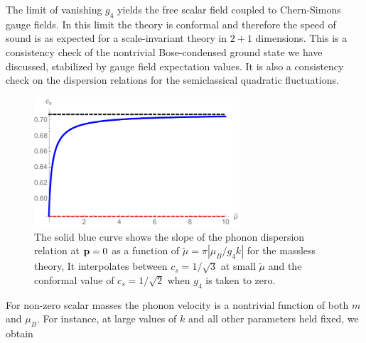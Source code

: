 \eea
The limit of vanishing $g_4$ yields the free scalar field coupled to Chern-Simons gauge fields. In this limit the theory is conformal and therefore the speed of sound is as expected for a scale-invariant theory in $2+1$ dimensions. This is a consistency check of  the nontrivial Bose-condensed ground state we have discussed, stabilized by gauge field expectation values. It is also a consistency check on the dispersion relations for the semiclassical quadratic fluctuations.
\begin{figure}[h]
\begin{center}
\includegraphics[width=3in]{Chapter_3_Folder_1806.06976/figures/soundspeed.pdf}
\end{center}
\caption{ The solid blue curve shows the slope of the phonon dispersion relation at ${\bf p} =0$ as a function of $\tilde\mu = \pi|\mu_B/g_4 k|$ for the massless theory, It interpolates between $c_s=1/\sqrt{3}$ at small $\tilde\mu$ and the conformal value of $c_s = 1/\sqrt{2}$ when $g_4$ is taken to zero.
}
\end{figure}
For non-zero scalar masses the phonon velocity is a nontrivial function of both $m$ and $\mu_B$.  For instance, at large values of $k$ and all other parameters held fixed, we obtain
